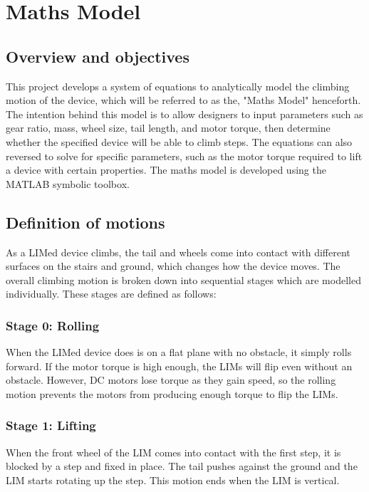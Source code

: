 \chapter{Maths Model}

\section{Overview and objectives}

This project develops a system of equations to analytically model the climbing motion of the device, which will be referred to as the, "Maths Model" henceforth. The intention behind this model is to allow designers to input parameters such as gear ratio, mass, wheel size, tail length, and motor torque, then determine whether the specified device will be able to climb steps. The equations can also reversed to solve for specific parameters, such as the motor torque required to lift a device with certain properties. The maths model is developed using the MATLAB symbolic toolbox.\\

\section{Definition of motions}

As a LIMed device climbs, the tail and wheels come into contact with different surfaces on the stairs and ground, which changes how the device moves. The overall climbing motion is broken down into sequential stages which are modelled individually. These stages are defined as follows:\\
\subsection*{Stage 0: Rolling}

When the LIMed device does is on a flat plane with no obstacle, it simply rolls forward. If the motor torque is high enough, the LIMs will flip even without an obstacle. However, DC motors lose torque as they gain speed, so the rolling motion prevents the motors from producing enough torque to flip the LIMs.\\

\subsection*{Stage 1: Lifting}
When the front wheel of the LIM comes into contact with the first step, it is blocked by a step and fixed in place. The tail pushes against the ground and the LIM starts rotating up the step. This motion ends when the LIM is vertical.
\\
